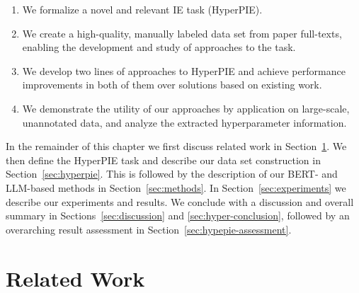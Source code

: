 \begin{enumerate}
    \item We formalize a novel and relevant IE task (HyperPIE).
    \item We create a high-quality, manually labeled data set from paper full-texts, enabling the development and study of approaches to the task.
    \item We develop two lines of approaches to HyperPIE and achieve performance improvements in both of them over solutions based on existing work.
    \item We demonstrate the utility of our approaches by application on large-scale, unannotated data, and analyze the extracted hyperparameter information.
\end{enumerate}

In the remainder of this chapter we first discuss related work in Section~\ref{sec:refwork}. We then define the HyperPIE task and describe our data set construction in Section~\ref{sec:hyperpie}. This is followed by the description of our BERT- and LLM-based methods in Section~\ref{sec:methods}. In Section~\ref{sec:experiments} we describe our experiments and results. We conclude with a discussion %
and overall summary in Sections~\ref{sec:discussion} and \ref{sec:hyper-conclusion}, followed by an overarching result assessment in Section~\ref{sec:hypepie-assessment}.


\section{Related Work}\label{sec:refwork}


